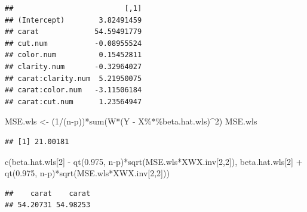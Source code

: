 \documentclass[
]{book}
\newenvironment{Shaded}{\begin{snugshade}}{\end{snugshade}}
\newcommand{\DecValTok}[1]{\textcolor[rgb]{0.00,0.00,0.81}{#1}}
\newcommand{\FloatTok}[1]{\textcolor[rgb]{0.00,0.00,0.81}{#1}}
\newcommand{\FunctionTok}[1]{\textcolor[rgb]{0.00,0.00,0.00}{#1}}
\newcommand{\NormalTok}[1]{#1}
\newcommand{\OtherTok}[1]{\textcolor[rgb]{0.56,0.35,0.01}{#1}}
\newcommand{\SpecialCharTok}[1]{\textcolor[rgb]{0.00,0.00,0.00}{#1}}
\begin{document}
\begin{verbatim}
##                          [,1]
## (Intercept)        3.82491459
## carat             54.59491779
## cut.num           -0.08955524
## color.num          0.15452811
## clarity.num       -0.32964027
## carat:clarity.num  5.21950075
## carat:color.num   -3.11506184
## carat:cut.num      1.23564947
\end{verbatim}

\begin{Shaded}
\begin{Highlighting}[]
\NormalTok{MSE.wls }\OtherTok{\textless{}{-}}\NormalTok{ (}\DecValTok{1}\SpecialCharTok{/}\NormalTok{(n}\SpecialCharTok{{-}}\NormalTok{p))}\SpecialCharTok{*}\FunctionTok{sum}\NormalTok{(W}\SpecialCharTok{*}\NormalTok{(Y }\SpecialCharTok{{-}}\NormalTok{ X}\SpecialCharTok{\%*\%}\NormalTok{beta.hat.wls)}\SpecialCharTok{\^{}}\DecValTok{2}\NormalTok{)}
\NormalTok{MSE.wls}
\end{Highlighting}
\end{Shaded}

\begin{verbatim}
## [1] 21.00181
\end{verbatim}

\begin{Shaded}
\begin{Highlighting}[]
\FunctionTok{c}\NormalTok{(beta.hat.wls[}\DecValTok{2}\NormalTok{] }\SpecialCharTok{{-}} \FunctionTok{qt}\NormalTok{(}\FloatTok{0.975}\NormalTok{, n}\SpecialCharTok{{-}}\NormalTok{p)}\SpecialCharTok{*}\FunctionTok{sqrt}\NormalTok{(MSE.wls}\SpecialCharTok{*}\NormalTok{XWX.inv[}\DecValTok{2}\NormalTok{,}\DecValTok{2}\NormalTok{]), beta.hat.wls[}\DecValTok{2}\NormalTok{] }\SpecialCharTok{+} \FunctionTok{qt}\NormalTok{(}\FloatTok{0.975}\NormalTok{, n}\SpecialCharTok{{-}}\NormalTok{p)}\SpecialCharTok{*}\FunctionTok{sqrt}\NormalTok{(MSE.wls}\SpecialCharTok{*}\NormalTok{XWX.inv[}\DecValTok{2}\NormalTok{,}\DecValTok{2}\NormalTok{]))}
\end{Highlighting}
\end{Shaded}

\begin{verbatim}
##    carat    carat 
## 54.20731 54.98253
\end{verbatim}
\end{document}
